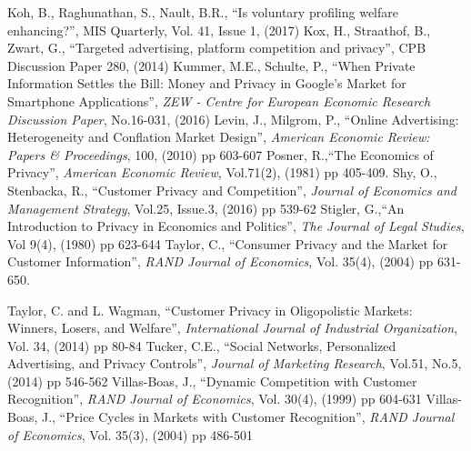 \documentclass[12pt]{article}
\begin{document}
\begin{thebibliography}{99}
 Koh, B., Raghunathan, S., Nault, B.R., ``Is voluntary profiling welfare enhancing?'', MIS Quarterly, Vol. 41, Issue 1, (2017)
 Kox, H., Straathof, B., Zwart, G., ``Targeted advertising, platform competition and privacy'', CPB Discussion Paper 280, (2014)
 Kummer, M.E., Schulte, P., ``When Private Information Settles the Bill: Money and Privacy in Google's Market for Smartphone Applications'', \textit{ZEW - Centre for European Economic Research Discussion Paper}, No.16-031, (2016) 
\bibitem{} Levin, J., Milgrom, P.,  ``Online Advertising: Heterogeneity and Conflation Market Design'', \textit{ American Economic Review: Papers \& Proceedings}, 100, (2010) pp 603-607
 Posner, R.,``The Economics of Privacy'', \textit{American Economic Review}, Vol.71(2), (1981) pp 405-409.
 Shy, O., Stenbacka, R., ``Customer Privacy and Competition'', 
\textit{Journal of Economics and Management Strategy}, Vol.25, Issue.3, (2016) pp 539-62
 Stigler, G.,``An Introduction to Privacy in Economics and Politics'', \textit{The Journal
of Legal Studies}, Vol 9(4), (1980) pp 623-644
 Taylor, C., ``Consumer Privacy and the Market for Customer Information'', \textit{RAND
Journal of Economics}, Vol. 35(4), (2004) pp 631-650.

 Taylor, C. and L. Wagman, ``Customer Privacy in Oligopolistic Markets: Winners,
Losers, and Welfare'', \textit{International Journal of Industrial Organization}, Vol. 34, (2014) pp 80-84
 Tucker, C.E., ``Social Networks, Personalized Advertising, and Privacy Controls'', 
\textit{Journal of Marketing Research}, Vol.51, No.5, (2014) pp 546-562      
 Villas-Boas, J., ``Dynamic Competition with Customer Recognition”, \textit{RAND Journal
of Economics}, Vol. 30(4), (1999) pp 604-631  
 Villas-Boas, J., ``Price Cycles in Markets with Customer Recognition”, \textit{RAND Journal
	of Economics}, Vol. 35(3), (2004) pp 486-501
\end{thebibliography}


	
\end{document}
